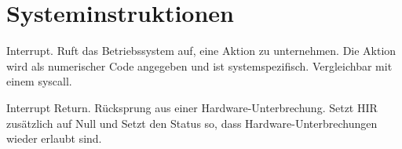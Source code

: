 \section{Systeminstruktionen}

\glqq Interrupt\grqq.
Ruft das Betriebssystem auf, eine Aktion zu unternehmen. 
Die Aktion wird als numerischer Code angegeben und ist systemspezifisch.
Vergleichbar mit einem \glqq syscall\grqq.

\glqq Interrupt Return\grqq.
Rücksprung aus einer Hardware-Unterbrechung. Setzt HIR zusätzlich auf Null
und Setzt den Status so, dass Hardware-Unterbrechungen wieder erlaubt sind.

